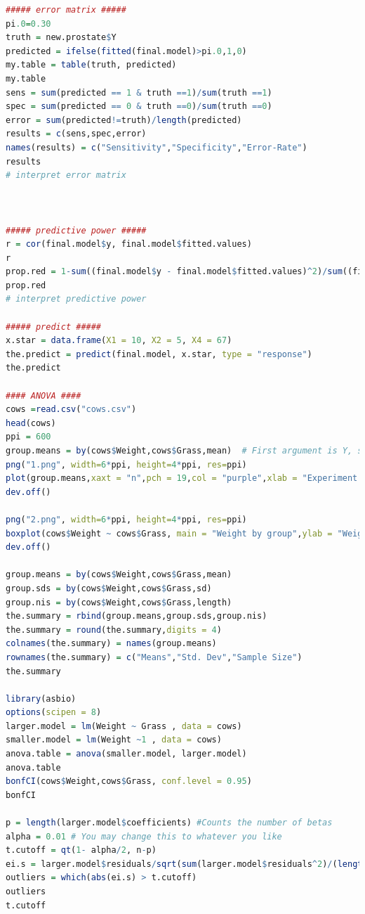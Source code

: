 \documentclass[a4paper,11pt,onecolumn,twoside]{article}
\begin{document}
\begin{lstlisting}[language=R,caption={R script for Project 2}]
##### error matrix #####
pi.0=0.30
truth = new.prostate$Y
predicted = ifelse(fitted(final.model)>pi.0,1,0)
my.table = table(truth, predicted)
my.table
sens = sum(predicted == 1 & truth ==1)/sum(truth ==1)
spec = sum(predicted == 0 & truth ==0)/sum(truth ==0)
error = sum(predicted!=truth)/length(predicted)
results = c(sens,spec,error)
names(results) = c("Sensitivity","Specificity","Error-Rate")
results
# interpret error matrix



##### predictive power #####
r = cor(final.model$y, final.model$fitted.values)
r
prop.red = 1-sum((final.model$y - final.model$fitted.values)^2)/sum((final.model$y - mean(final.model$y))^2)
prop.red
# interpret predictive power

##### predict #####
x.star = data.frame(X1 = 10, X2 = 5, X4 = 67)
the.predict = predict(final.model, x.star, type = "response")
the.predict

#### ANOVA ####
cows =read.csv("cows.csv")
head(cows)
ppi = 600
group.means = by(cows$Weight,cows$Grass,mean)  # First argument is Y, second is grouping column/s
png("1.png", width=6*ppi, height=4*ppi, res=ppi)
plot(group.means,xaxt = "n",pch = 19,col = "purple",xlab = "Experiment Group",ylab = "Weight",main = "Average Weight by group",type = "b") #Addinf xaxt = "n" removes the default X axis ticks.
dev.off()

png("2.png", width=6*ppi, height=4*ppi, res=ppi)
boxplot(cows$Weight ~ cows$Grass, main = "Weight by group",ylab = "Weight")
dev.off()

group.means = by(cows$Weight,cows$Grass,mean)
group.sds = by(cows$Weight,cows$Grass,sd)
group.nis = by(cows$Weight,cows$Grass,length)
the.summary = rbind(group.means,group.sds,group.nis)
the.summary = round(the.summary,digits = 4)
colnames(the.summary) = names(group.means)
rownames(the.summary) = c("Means","Std. Dev","Sample Size")
the.summary

library(asbio)
options(scipen = 8)
larger.model = lm(Weight ~ Grass , data = cows)
smaller.model = lm(Weight ~1 , data = cows)
anova.table = anova(smaller.model, larger.model)
anova.table
bonfCI(cows$Weight,cows$Grass, conf.level = 0.95)
bonfCI

p = length(larger.model$coefficients) #Counts the number of betas
alpha = 0.01 # You may change this to whatever you like
t.cutoff = qt(1- alpha/2, n-p)
ei.s = larger.model$residuals/sqrt(sum(larger.model$residuals^2)/(length(larger.model$residuals) - length(larger.model$coefficients)))
outliers = which(abs(ei.s) > t.cutoff)
outliers
t.cutoff


\end{lstlisting}
\end{document}

